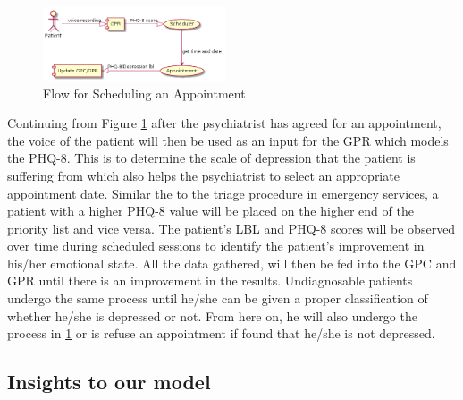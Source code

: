 \documentclass{article}
\begin{document}
	\begin{figure}[h]
 		\begin{center}
		\includegraphics[width=0.48\textwidth]{appointment} 
  		\end{center}
  		\caption{Flow for Scheduling an Appointment}
  		\label{sch_app} 
 	\end{figure}

	Continuing from Figure \ref{sch_app} after the psychiatrist has agreed for an appointment, the voice of the patient will then be used as an input for the GPR which models the PHQ-8. 
	This is to determine the scale of depression that the patient is suffering from which also helps the psychiatrist to select an appropriate appointment date. 		
	Similar the to the triage procedure in emergency services, a patient with a higher PHQ-8 value will be placed on the higher end of the priority list and vice versa.
	The patient's LBL and PHQ-8 scores will be observed over time during scheduled sessions to identify the patient's improvement in his/her emotional state.
	All the data gathered, will then be fed into the GPC and GPR until there is an improvement in the results.
	Undiagnosable patients undergo the same process until he/she can be given a proper classification of whether he/she is depressed or not.
	From here on, he will also undergo the process in \ref{sch_app} or is refuse an appointment if found that he/she is not depressed.

	\subsection{Insights to our model}
\end{document}
